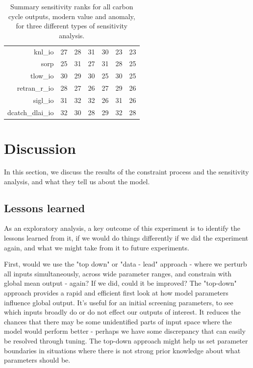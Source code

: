 \documentclass[gmd, manuscript]{copernicus}
\begin{document}
\begin{table}[ht]
\begin{tabular}{rrrrrrr}
  knl\_io & 27 & 28 & 31 & 30 & 23 & 23 \\ 
  sorp & 25 & 31 & 27 & 31 & 28 & 25 \\ 
  tlow\_io & 30 & 29 & 30 & 25 & 30 & 25 \\ 
  retran\_r\_io & 28 & 27 & 26 & 27 & 29 & 26 \\ 
  sigl\_io & 31 & 32 & 32 & 26 & 31 & 26 \\ 
  dcatch\_dlai\_io & 32 & 30 & 28 & 29 & 32 & 28 \\ 
   \hline
\end{tabular}
\caption{Summary sensitivity ranks for all carbon cycle outputs, modern value and anomaly, for three different types of sensitivity analysis.}
\label{tab:sensitivity_ranks}
\end{table}



\section{Discussion}\label{sec:discussion}
In this section, we discuss the results of the constraint process and the sensitivity analysis, and what they tell us about the model.

\subsection{Lessons learned}\label{ssec:lessons}

As an exploratory analysis, a key outcome of this experiment is to identify the lessons learned from it, if we would do things differently if we did the experiment again, and what we might take from it to future experiments.

First, would we use  the "top down" or "data - lead" approach - where we perturb all inputs simultaneously, across wide parameter ranges, and constrain with global mean output - again? If we did, could it be improved? The "top-down" approach provides a rapid and efficient first look at how model parameters influence global output. It's useful for an initial screening parameters, to see which inputs broadly do or do not effect our outputs of interest. It reduces the chances that there may be some unidentified parts of input space where the model would perform better - perhaps we have some discrepancy that can easily be resolved through tuning. The top-down approach might help us set parameter boundaries in situations where there is not strong prior knowledge about what parameters should be.
\end{document}
